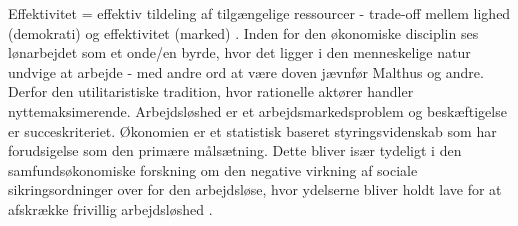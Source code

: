 \noindent Effektivitet = effektiv tildeling af tilgængelige ressourcer - trade-off mellem lighed (demokrati) og effektivitet (marked) \parencite[24-25]{Halvorsen1999}. Inden for den økonomiske disciplin ses lønarbejdet som et onde/en byrde, hvor det ligger i den menneskelige natur undvige at arbejde - med andre ord at være doven jævnfør Malthus og andre. Derfor den utilitaristiske tradition, hvor rationelle aktører handler nyttemaksimerende. Arbejdsløshed er et arbejdsmarkedsproblem og beskæftigelse er succeskriteriet. Økonomien er et statistisk baseret styringsvidenskab som har forudsigelse som den primære målsætning. Dette bliver især tydeligt i den samfundsøkonomiske forskning om den negative virkning af sociale sikringsordninger over for den arbejdsløse, hvor ydelserne bliver holdt lave for at afskrække frivillig arbejdsløshed \parencite[26]{Halvorsen1999}. 

















































